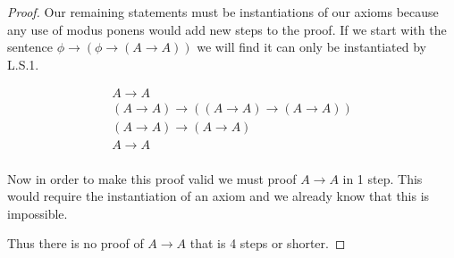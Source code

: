 \documentclass{article}
\begin{document}
\begin{proof}
Our remaining statements must be instantiations of our axioms because any use of modus ponens would add new steps to the proof.
If we start with the sentence $\phi \rightarrow (\phi \rightarrow (A \rightarrow A))$ we will find it can only be instantiated by L.S.1.

\begin{gather*}
A \rightarrow A \\
(A \rightarrow A) \rightarrow ((A \rightarrow A) \rightarrow (A \rightarrow A)) \tag*{L.S.1} \\
(A \rightarrow A) \rightarrow (A \rightarrow A) \tag*{Modus Ponenes} \\
A \rightarrow A \tag*{Modus Ponens}\\
\end{gather*}

Now in order to make this proof valid we must proof $A \rightarrow A$ in 1 step.
This would require the instantiation of an axiom and we already know that this is impossible.

Thus there is no proof of $A \rightarrow A$ that is 4 steps or shorter.

\end{proof}
\end{document}
